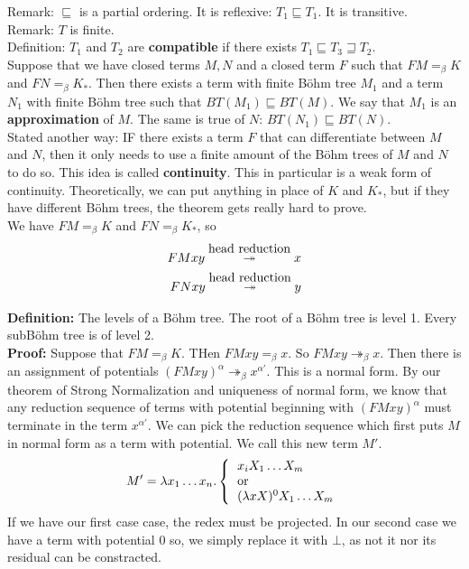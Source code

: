 Remark: $\sqsubseteq$ is a partial ordering. It is reflexive: $T_1 \sqsubseteq T_1$. It is transitive.\\

Remark: $T$ is finite.\\

Definition: $T_1$ and $T_2$ are \textbf{compatible} if there exists $T_1 \sqsubseteq T_3 \sqsupseteq T_2$.\\

Suppose that we have closed terms $M,N$ and a closed term $F$ such that $FM =_\beta K$ and $FN =_\beta K_*$. Then there exists a term with finite B\"ohm tree $M_1$ and a term $N_1$ with finite B\"ohm tree such that $BT(M_1) \sqsubseteq BT(M)$. We say that $M_1$ is an \textbf{approximation} of $M$. The same is true of $N$: $BT(N_1) \sqsubseteq BT(N)$.\\

Stated another way: IF there exists a term $F$ that can differentiate between $M$ and $N$, then it only needs to use a finite amount of the B\"ohm trees of $M$ and $N$ to do so. This idea is called \textbf{continuity}. This in particular is a weak form of continuity. Theoretically, we can put anything in place of $K$ and $K_*$, but if they have different B\"ohm trees, the theorem gets really hard to prove.\\


We have $FM =_\beta K$ and $FN =_\beta K_*$, so
\begin{eqnarray*}
  FMxy \stackrel{\hbox{head reduction}}{\twoheadrightarrow} x\\
  FNxy \stackrel{\hbox{head reduction}}{\twoheadrightarrow} y\\
\end{eqnarray*}

\textbf{Definition:} The levels of a B\"ohm tree. The root of a B\"ohm tree is level 1. Every subB\"ohm tree is of level 2.\\

\textbf{Proof:} Suppose that $FM =_\beta K$. THen $FMxy =_\beta x$. So $FMxy \twoheadrightarrow_\beta x$. Then there is an assignment of potentials $(FMxy)^{\alpha} \twoheadrightarrow_\beta x^{\alpha'}$. This is a normal form. By our theorem of Strong Normalization and uniqueness of normal form, we know that any reduction sequence of terms with potential beginning with $(FMxy)^\alpha$ must terminate in the term $x^{\alpha'}$. We can pick the reduction sequence which first puts $M$ in normal form as a term with potential. We call this new term $M'$.
\begin{equation*}
  M' = \l x_1\ldots x_n . \left\{
  \begin{tabular}{l}
    $x_i X_1\ldots X_m$\\
    or\\
    $(\l x X)^{0}X_1\ldots X_m$
  \end{tabular}
  \right.
\end{equation*}
If we have our first case case, the redex must be projected. In our second case we have a term with potential $0$ so, we simply replace it with $\bot$, as not it nor its residual can be constracted.\\

